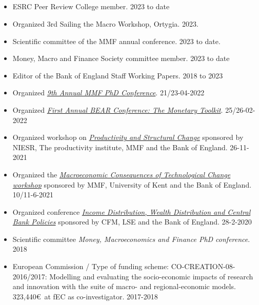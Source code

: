 \documentclass[margin, 11pt]{res} %
\begin{document}
\begin{resume}


\section{}
\begin{itemize}
\item ESRC Peer Review College member. \hfill 2023 to date 
\item Organized 3rd Sailing the Macro Workshop, Ortygia. \hfill 2023.
\item Scientific committee of the MMF annual conference. \hfill 2023 to date.
\item Money, Macro and Finance Society committee member. \hfill 2023 to date 
\item Editor of the Bank of England Staff Working Papers. \hfill 2018 to 2023
\item Organized \emph{\href{https://www.mmf.ac.uk/phd/2022-phd-conference/}{9th Annual MMF PhD Conference}}. \hfill 21/23-04-2022
\item Organized \emph{\href{https://www.bankofengland.co.uk/events/2022/february/first-annual-bear-conference}{First Annual BEAR Conference: The Monetary Toolkit}}. \hfill 25/26-02-2022
\item Organized workshop on \emph{\href{https://www.mmf.ac.uk/productivity-workshop/}{Productivity and Structural Change}} sponsored by NIESR, The productivity institute, MMF and the Bank of England. \hfill 26-11-2021
\item Organized the  \emph{\href{https://www.bankofengland.co.uk/events/2021/may/mmf-workshop-on-macroeconomic-consequences-of-technological-change}{Macroeconomic Consequences of Technological Change workshop}} sponsored by MMF, University of Kent and the Bank of England. \hfill 10/11-6-2021
\item Organized conference \emph{\href{https://www.dropbox.com/s/vfv3qz5ixi32ywf/Programme.pdf?dl=0}{Income Distribution, Wealth Distribution and Central Bank Policies}} sponsored by CFM, LSE and the Bank of England. \hfill 28-2-2020
\item Scientific committee \emph{Money, Macroeconomics and Finance PhD conference}. \hfill 2018
\item European Commission / Type of funding scheme: CO-CREATION-08-2016/2017: Modelling and evaluating the socio-economic impacts of research and innovation with the suite of macro- and regional-economic models. 323,440\euro$\,$  at fEC  as co-investigator. \hfill 2017-2018

\end{itemize}
\end{resume}
\end{document}
